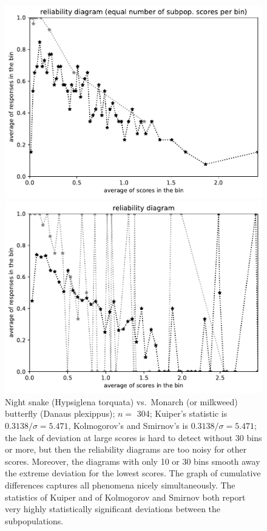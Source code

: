 \documentclass{article}
\newlength{\imsize}
\begin{document}
\begin{figure}
\begin{centering}
\parbox{\imsize}{\includegraphics[width=\imsize]
{../codes/unweighted/nll-1-60-night-snake-Hypsiglena-torquata_323-monarch-monarch-butterfly-milkweed-butterfly-Danaus-plexippusequisamps50.pdf}}
\quad\quad
\parbox{\imsize}{\includegraphics[width=\imsize]
{../codes/unweighted/nll-1-60-night-snake-Hypsiglena-torquata_323-monarch-monarch-butterfly-milkweed-butterfly-Danaus-plexippusequiscore50.pdf}}

\end{centering}
\caption{Night snake (Hypsiglena torquata) vs.\ Monarch (or milkweed) butterfly
         (Danaus plexippus); $n =$ 304;
         Kuiper's statistic is $0.3138 / \sigma = 5.471$,
         Kolmogorov's and Smirnov's is $0.3138 / \sigma = 5.471$;
         the lack of deviation at large scores is hard to detect
         without 30 bins or more, but then the reliability diagrams
         are too noisy for other scores. Moreover, the diagrams
         with only 10 or 30 bins smooth away the extreme deviation
         for the lowest scores. The graph of cumulative differences
         captures all phenomena nicely simultaneously.
         The statistics of Kuiper and of Kolmogorov and Smirnov both report
         very highly statistically significant deviations
         between the subpopulations.
}
\label{night-snake_monarch-butterfly}
\end{figure}
\end{document}
